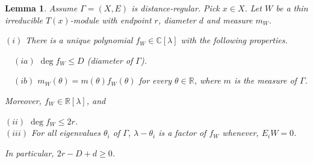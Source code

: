\documentclass[
]{book}
\newtheorem{lemma}{Lemma}[chapter]
\theoremstyle{definition}
\theoremstyle{definition}
\theoremstyle{definition}
\theoremstyle{definition}
\theoremstyle{remark}
\begin{document}
\begin{lemma}
\protect\hypertarget{lem:basic-data}{}\label{lem:basic-data}Assume \(\Gamma = (X, E)\) is distance-regular. Pick \(x\in X\). Let \(W\) be a thin irreducible \(T(x)\)-module with endpoint \(r\), diameter \(d\) and measure \(m_W\).

\((i)\) There is a unique polynomial \(f_W \in \mathbb{C}[\lambda]\) with the following properties.

\(\quad (ia)\) \(\deg f_W \leq D\) (diameter of \(\Gamma\)).

\(\quad (ib)\) \(m_W(\theta) = m(\theta)f_W(\theta)\) for every \(\theta\in \mathbb{R}\), where \(m\) is the measure of \(\Gamma\).

Moreover, \(f_W\in \mathbb{R}[\lambda]\), and

\((ii)\) \(\deg f_W \leq 2r\).\\
\((iii)\) For all eigenvalues \(\theta_i\) of \(\Gamma\), \(\lambda - \theta_i\) is a factor of \(f_W\) whenever, \(E_iW = 0\).

In particular, \(2r-D+d\geq 0\).
\end{lemma}
\end{document}
